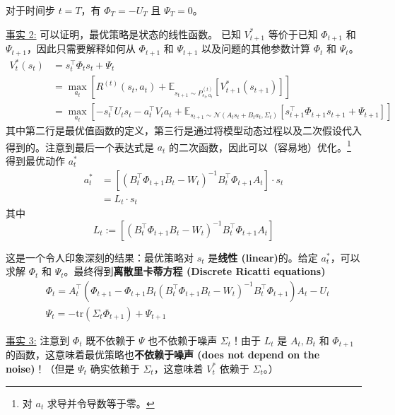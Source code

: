 \begin{enumerate}[label=\textbf{步骤 \arabic*}]
\begin{enumerate}[label=\arabic*.]
        对于时间步 $t=T$，有 $\Phi_T = -U_T$ 且 $\Psi_T = 0$。

        \underline{事实 2:} 可以证明，最优策略是状态的线性函数。
        已知 $V_{t+1}^*$ 等价于已知 $\Phi_{t+1}$ 和 $\Psi_{t+1}$，因此只需要解释如何从 $\Phi_{t+1}$ 和 $\Psi_{t+1}$ 以及问题的其他参数计算 $\Phi_t$ 和 $\Psi_t$。
        \begin{align*}
            V_t^*(s_t) 
            &= s_t^\top \Phi_t s_t + \Psi_t \\
            &= \max_{a_t} \left[ R^{(t)}(s_t, a_t) + \mathbb{E}_{s_{t+1} \sim P_{s_t, a_t}^{(t)}}[V_{t+1}^*(s_{t+1})] \right] \\
            &= \max_{a_t} \left[ -s_t^\top U_t s_t - a_t^\top V_t a_t + \mathbb{E}_{s_{t+1} \sim \mathcal{N}(A_t s_t + B_t a_t, \Sigma_t)}[s_{t+1}^\top \Phi_{t+1} s_{t+1} + \Psi_{t+1}] \right]
        \end{align*}
        其中第二行是最优值函数的定义，第三行是通过将模型动态过程以及二次假设代入得到的。注意到最后一个表达式是 $a_t$ 的二次函数，因此可以（容易地）优化。\footnote{对 $a_t$ 求导并令导数等于零。} 得到最优动作 $a_t^*$
        \begin{align*}
            a_t^* &= \left[ (B_t^\top \Phi_{t+1} B_t - W_t)^{-1} B_t^\top \Phi_{t+1} A_t \right] \cdot s_t \\
            &= L_t \cdot s_t
        \end{align*}
        其中
        \[
            L_t := [(B_t^\top \Phi_{t+1} B_t - W_t)^{-1} B_t^\top \Phi_{t+1} A_t]
        \]

        这是一个令人印象深刻的结果：最优策略对 $s_t$ 是\textbf{线性 (linear)}的。给定 $a_t^*$，可以求解 $\Phi_t$ 和 $\Psi_t$。最终得到\textbf{离散里卡蒂方程 (Discrete Ricatti equations)}
        \begin{align*}
            &\Phi_t = A_t^\top \left( \Phi_{t+1} - \Phi_{t+1} B_t (B_t^\top \Phi_{t+1} B_t - W_t)^{-1} B_t^\top \Phi_{t+1} \right) A_t - U_t \\
            &\Psi_t = -\text{tr}(\Sigma_t \Phi_{t+1}) + \Psi_{t+1}
        \end{align*}

        \underline{事实 3:} \label{fact:3} 注意到 $\Phi_t$ 既不依赖于 $\Psi$ 也不依赖于噪声 $\Sigma_t$！由于 $L_t$ 是 $A_t, B_t$ 和 $\Phi_{t+1}$ 的函数，这意味着最优策略也\textbf{不依赖于噪声 (does not depend on the noise)}！（但是 $\Psi_t$ 确实依赖于 $\Sigma_t$，这意味着 $V_t^*$ 依赖于 $\Sigma_t$。）
    \end{enumerate}
\end{enumerate}

